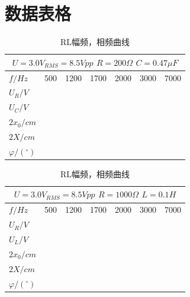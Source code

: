 \section{数据表格}
\begin{table}[h]
    \centering
    \caption*{RC幅频，相频曲线}
    \begin{tabular}[\linewidth]{|m{2cm}|m{2cm}|m{2cm}|m{2cm}|m{2cm}|m{2cm}|m{2cm}|}
        \hline
        \multicolumn{7}{|c|}{$U=3.0V_{RMS}=8.5Vpp$  $R=200\Omega $  $C=0.47\mu F$}\\
        \hline
        $f/Hz$ & 500 & 1200 & 1700 & 2000 & 3000 & 7000 \\
        \hline
        $U_R/V$ & & & & & & \\
        \hline
        $U_C/V$ & & & & & & \\
        \hline
        $2x_0/cm$ & & & & & & \\
        \hline
        $2X/cm$ & & & & & & \\
        \hline
        $\varphi/(^{\circ} )$ & & & & & & \\
        \hline
    \end{tabular}
    \caption*{RL幅频，相频曲线}
    \begin{tabular}[\linewidth]{|m{2cm}|m{2cm}|m{2cm}|m{2cm}|m{2cm}|m{2cm}|m{2cm}|}
        \hline
        \multicolumn{7}{|c|}{$U=3.0V_{RMS}=8.5Vpp$  $R=1000\Omega $  $L=0.1H$}\\
        \hline
        $f/Hz$ & 500 & 1200 & 1700 & 2000 & 3000 & 7000 \\
        \hline
        $U_R/V$ & & & & & & \\
        \hline
        $U_L/V$ & & & & & & \\
        \hline
        $2x_0/cm$ & & & & & & \\
        \hline
        $2X/cm$ & & & & & & \\
        \hline
        $\varphi/(^{\circ} )$ & & & & & & \\
        \hline
    \end{tabular}
\end{table}
